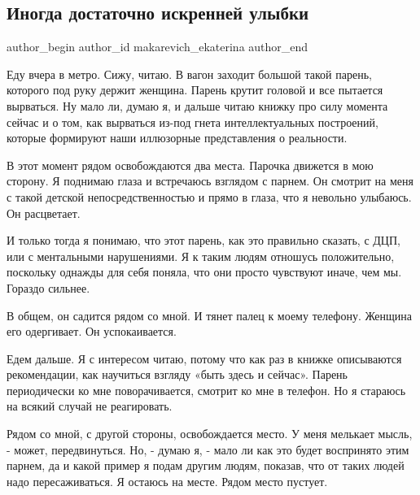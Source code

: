  
 
 
 
 
 
\subsection{Иногда достаточно искренней улыбки}
\label{sec:30_10_2019.fb.makarevich_ekaterina.1.ulybka_iskrennjaja}
 
\ifcmt
 author_begin
   author_id makarevich_ekaterina
 author_end
\fi

Еду вчера в метро. Сижу, читаю. В вагон заходит большой такой парень, которого
под руку держит женщина. Парень крутит головой и все пытается вырваться. Ну
мало ли, думаю я, и дальше читаю книжку про силу момента сейчас и о том, как
вырваться из-под гнета интеллектуальных построений, которые формируют наши
иллюзорные представления о реальности. 

В этот момент рядом освобождаются два места. Парочка движется в мою сторону. Я
поднимаю глаза и встречаюсь взглядом с парнем. Он смотрит на меня с такой
детской непосредственностью и прямо в глаза, что я невольно улыбаюсь. Он
расцветает. 

И только тогда я понимаю, что этот парень, как это правильно сказать, с ДЦП,
или с ментальными нарушениями. Я к таким людям отношусь положительно, поскольку
однажды для себя поняла, что они просто чувствуют иначе, чем мы. Гораздо
сильнее. 

В общем, он садится рядом со мной. И тянет палец к моему телефону. Женщина его
одергивает. Он успокаивается. 

Едем дальше. Я с интересом читаю, потому что как раз в книжке описываются
рекомендации, как научиться взгляду «быть здесь и сейчас». Парень периодически
ко мне поворачивается, смотрит ко мне в телефон. Но я стараюсь на всякий случай
не реагировать. 

Рядом со мной, с другой стороны, освобождается место. У меня мелькает мысль, -
может, передвинуться. Но, - думаю я, - мало ли как это будет воспринято этим
парнем, да и какой пример я подам другим людям, показав, что от таких людей
надо пересаживаться. Я остаюсь на месте. Рядом место пустует. 

